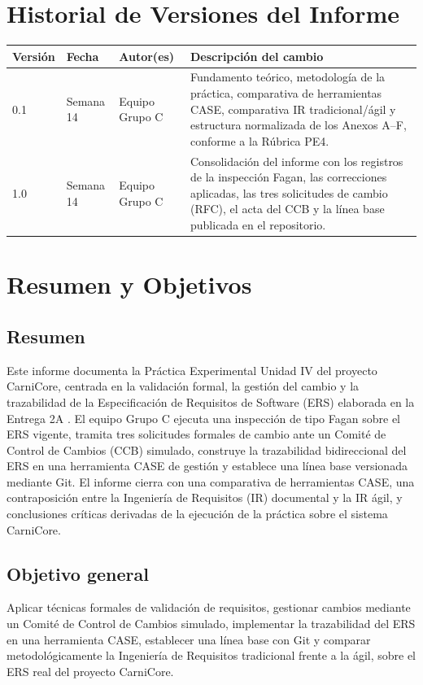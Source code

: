 \documentclass[11pt,a4paper]{article}
\begin{document}
\newpage
\section*{Historial de Versiones del Informe}
\begin{longtable}{|p{1.5cm}|p{2.2cm}|p{3cm}|p{8cm}|}
\hline
\textbf{Versión} & \textbf{Fecha} & \textbf{Autor(es)} & \textbf{Descripción del cambio} \\
\hline
0.1 & Semana 14 & Equipo Grupo C & Fundamento teórico, metodología de la práctica, comparativa de herramientas CASE, comparativa IR tradicional/ágil y estructura normalizada de los Anexos A--F, conforme a la Rúbrica PE4. \\
\hline
1.0 & Semana 14 & Equipo Grupo C & Consolidación del informe con los registros de la inspección Fagan, las correcciones aplicadas, las tres solicitudes de cambio (RFC), el acta del CCB y la línea base publicada en el repositorio. \\
\hline
\end{longtable}

\newpage
\tableofcontents
\newpage

\section{Resumen y Objetivos}
\subsection{Resumen}
Este informe documenta la Práctica Experimental Unidad IV del proyecto CarniCore, centrada en la validación formal, la gestión del cambio y la trazabilidad de la Especificación de Requisitos de Software (ERS) elaborada en la Entrega 2A \cite{iso29148}. El equipo Grupo C ejecuta una inspección de tipo Fagan sobre el ERS vigente, tramita tres solicitudes formales de cambio ante un Comité de Control de Cambios (CCB) simulado, construye la trazabilidad bidireccional del ERS en una herramienta CASE de gestión y establece una línea base versionada mediante Git. El informe cierra con una comparativa de herramientas CASE, una contraposición entre la Ingeniería de Requisitos (IR) documental y la IR ágil, y conclusiones críticas derivadas de la ejecución de la práctica sobre el sistema CarniCore.

\subsection{Objetivo general}
Aplicar técnicas formales de validación de requisitos, gestionar cambios mediante un Comité de Control de Cambios simulado, implementar la trazabilidad del ERS en una herramienta CASE, establecer una línea base con Git y comparar metodológicamente la Ingeniería de Requisitos tradicional frente a la ágil, sobre el ERS real del proyecto CarniCore.
\end{document}
